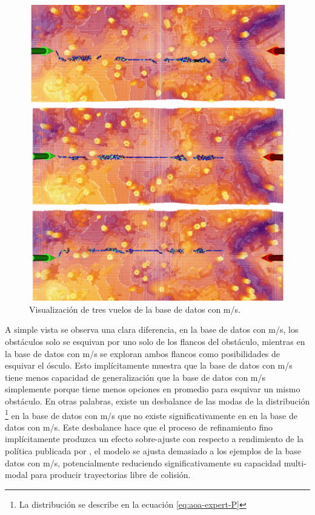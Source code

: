 \begin{figure}[H]
    \centering
    \includegraphics[scale=0.4]{partes/ImgJoao/1ms-sample.png}
    \caption[Visualización de tres vuelos de la base de datos con  m/s.]{Visualización de tres vuelos de la base de datos con  m/s.}
    \label{fig:1ms-sample}
\end{figure}

A simple vista se observa una clara diferencia, en la base de datos con  m/s, los obstáculos solo se esquivan por uno solo de los flancos del obstáculo, mientras en la base de datos con  m/s se exploran ambos flancos como posibilidades de esquivar el ósculo. Esto implícitamente muestra que la base de datos con  m/s tiene menos capacidad de generalización que la base de datos con  m/s simplemente porque tiene menos opciones en promedio para esquivar un mismo obstáculo. En otras palabras, existe un desbalance de las modas de la distribución \footnote{La distribución  se describe en la ecuación \ref{eq:aoa-expert-P}} en la base de datos con  m/s que no existe significativamente en en la base de datos con  m/s. Este desbalance hace que el proceso de refinamiento fino implícitamente produzca un efecto sobre-ajuste con respecto a rendimiento de la política publicada por \cite{Loquercio2021}, el modelo se ajusta demasiado a los ejemplos de la base datos con  m/s, potencialmente reduciendo significativamente su capacidad multi-modal para producir trayectorias libre de colisión.

